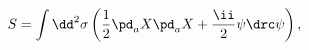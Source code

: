 \begin{equation}\label{1ds}
  S=\int\dd^2\sigma\left(\frac{1}{2}\pd_a X\pd_a
  X+\frac{\ii}{2}\psi\drc\psi\right),
\end{equation}

